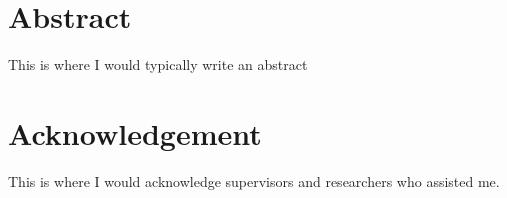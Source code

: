 \chapter*{Abstract}
This is where I would typically write an abstract
\pagebreak

\chapter*{Acknowledgement}
This is where I would acknowledge supervisors and researchers who assisted me.
\vspace*{0.2\textheight}



\pagebreak


\tableofcontents
\pagebreak

